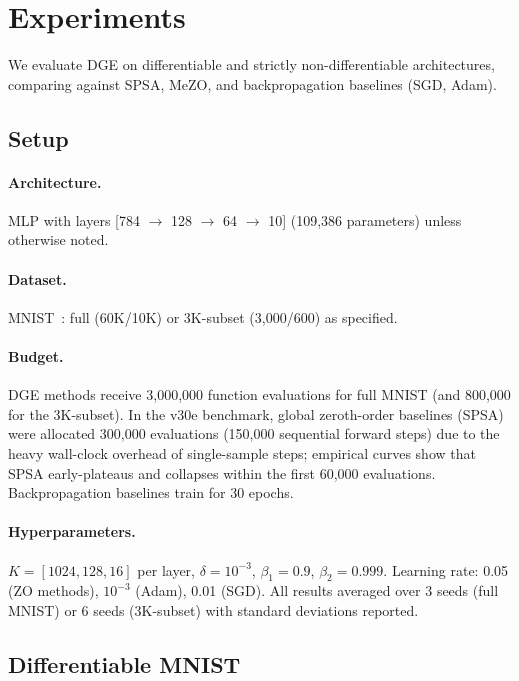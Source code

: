 \documentclass[10pt]{article}
\begin{document}
\section{Experiments}
\label{sec:experiments}

We evaluate DGE on differentiable and strictly non-differentiable architectures, comparing against SPSA, MeZO, and backpropagation baselines (SGD, Adam).

\subsection{Setup}

\paragraph{Architecture.} MLP with layers [784 $\to$ 128 $\to$ 64 $\to$ 10] (109,386 parameters) unless otherwise noted.

\paragraph{Dataset.} MNIST~\citep{lecun2015deep}: full (60K/10K) or 3K-subset (3,000/600) as specified.

\paragraph{Budget.} DGE methods receive 3,000,000 function evaluations for full MNIST (and 800,000 for the 3K-subset). In the v30e benchmark, global zeroth-order baselines (SPSA) were allocated 300,000 evaluations (150,000 sequential forward steps) due to the heavy wall-clock overhead of single-sample steps; empirical curves show that SPSA early-plateaus and collapses within the first 60,000 evaluations. Backpropagation baselines train for 30 epochs.

\paragraph{Hyperparameters.} $K = [1024, 128, 16]$ per layer, $\delta = 10^{-3}$, $\beta_1 = 0.9$, $\beta_2 = 0.999$. Learning rate: 0.05 (ZO methods), $10^{-3}$ (Adam), 0.01 (SGD). All results averaged over 3 seeds (full MNIST) or 6 seeds (3K-subset) with standard deviations reported.

\subsection{Differentiable MNIST}
\label{sec:mnist}
\end{document}
